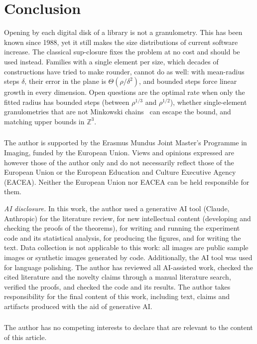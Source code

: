 \documentclass[runningheads]{llncs}
\newcommand{\Z}{\mathbb{Z}}
\begin{document}
\section{Conclusion}
Opening by each digital disk of a library is not a granulometry. This has been known since 1988, yet it still makes the size distributions of current software increase. The classical sup-closure fixes the problem at no cost and should be used instead. Families with a single element per size, which decades of constructions have tried to make rounder, cannot do as well: with mean-radius steps $\delta$, their error in the plane is $\Theta(\rho/\delta^2)$, and bounded steps force linear growth in every dimension. Open questions are the optimal rate when only the fitted radius has bounded steps (between $\rho^{1/3}$ and $\rho^{1/2}$), whether single-element granulometries that are not Minkowski chains~\cite{normand2003} can escape the bound, and matching upper bounds in $\Z^3$.

\begin{credits}
\subsubsection{\ackname}
The author is supported by the Erasmus Mundus Joint Master's Programme in Imaging, funded by the European Union. Views and opinions expressed are however those of the author only and do not necessarily reflect those of the European Union or the European Education and Culture Executive Agency (EACEA). Neither the European Union nor EACEA can be held responsible for them.

\emph{AI disclosure.} In this work, the author used a generative AI tool (Claude, Anthropic) for the literature review, for new intellectual content (developing and checking the proofs of the theorems), for writing and running the experiment code and its statistical analysis, for producing the figures, and for writing the text. Data collection is not applicable to this work: all images are public sample images or synthetic images generated by code. Additionally, the AI tool was used for language polishing. The author has reviewed all AI-assisted work, checked the cited literature and the novelty claims through a manual literature search, verified the proofs, and checked the code and its results. The author takes responsibility for the final content of this work, including text, claims and artifacts produced with the aid of generative AI.

\subsubsection{\discintname}
The author has no competing interests to declare that are relevant to the content of this article.
\end{credits}



\end{document}
